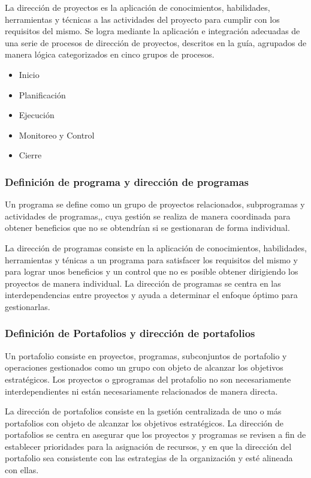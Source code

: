 La dirección de proyectos es la aplicación de conocimientos, habilidades, herramientas y técnicas a las actividades del proyecto para cumplir con los requisitos del mismo. Se logra mediante la aplicación e integración adecuadas de una serie de procesos de dirección de proyectos, descritos en la guía, agrupados de manera lógica categorizados en cinco grupos de procesos.

\begin{itemize}
\item{Inicio}
\item{Planificación}
\item{Ejecución}
\item{Monitoreo y Control}
\item{Cierre}
\end{itemize}

\subsubsection{Definición de programa y dirección de programas}

Un programa se define como un grupo de proyectos relacionados, subprogramas y actividades de programas,, cuya gestión se realiza de manera coordinada para obtener beneficios que no se obtendrían si se gestionaran de forma individual.

La dirección de programas consiste en la aplicación de conocimientos, habilidades, herramientas y ténicas a un programa para satisfacer los requisitos del mismo y para lograr unos beneficios y un control que no es posible obtener dirigiendo los proyectos de manera individual. La dirección de programas se centra en las interdependencias entre proyectos y ayuda a determinar el enfoque óptimo para gestionarlas.

\subsubsection{Definición de Portafolios y dirección de portafolios}

Un portafolio consiste en proyectos, programas, subconjuntos de portafolio y operaciones gestionados como un grupo con objeto de alcanzar los objetivos estratégicos. Los proyectos o gprogramas del protafolio no son necesariamente interdependientes ni están necesariamente relacionados de manera directa.

La dirección de portafolios consiste en la gsetión centralizada de uno o más portafolios con objeto de alcanzar los objetivos estratégicos. La dirección de portafolios se centra en asegurar que los proyectos y programas se revisen a fin de establecer prioridades para la asignación de recursos, y en que la dirección del portafolio sea consistente con las estrategias de la organización y esté alineada con ellas.

